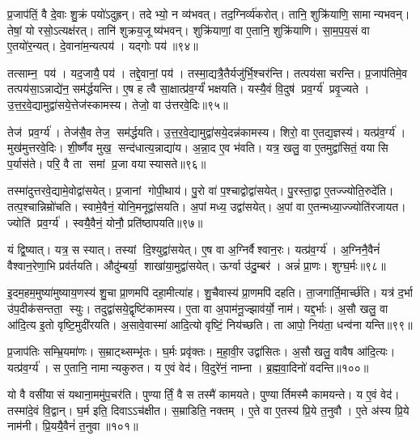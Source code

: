 प्र॒जाप॑तिं॒ वै दे॒वाः  शु॒क्रं पयो॑ऽदुह्रन्। 
तदेभ्यो॒ न व्य॑भवत्। 
तद॒ग्निर्व्य॑करोत्। 
तानि॒ शुक्रि॑याणि॒ सामान्यभवन्। 
तेषां॒ यो रसो॒ऽत्यक्ष॑रत्। 
तानि॑ शुक्रय॒जूष्य॑भवन्। 
शुक्रि॑याणां॒ वा ए॒तानि॒ शुक्रि॑याणि। 
सा॒म॒प॒य॒सं वा ए॒तयो॑र॒न्यत्। 
दे॒वाना॑म॒न्यत्पय॑। 
यद्गोः पय॑॥९४॥

तत्साम्न॒ पय॑। 
यद॒जायै॒ पय॑। 
तद्दे॒वानां॒ पय॑। 
तस्मा॒द्यत्रै॒तैर्यजु॑र्भि॒\-श्चर॑न्ति। 
तत्पय॑सा चरन्ति। 
प्र॒जाप॑तिमे॒व तत्पय॑सा॒ऽन्नाद्ये॑न॒ सम॑र्द्धयन्ति। 
ए॒ष ह त्वै सा॒क्षात्प्र॑व॒र्ग्यं॑ भक्षयति। 
यस्यै॒वं  वि॒दुष॑ प्रव॒र्ग्य॑ प्रवृ॒ज्यते। 
उ॒त्त॒र॒वे॒द्यामुद्वा॑स\-ये॒त्तेज॑स्कामस्य। 
तेजो॒ वा उ॑त्तरवे॒दिः॥९५॥

तेज॑ प्रव॒र्ग्य॑। 
तेज॑सै॒व तेज॒ सम॑र्द्धयति। 
उ॒त्त॒र॒वे॒द्यामुद्वा॑सये॒\-दन्न॑\-कामस्य। 
शिरो॒ वा ए॒तद्य॒ज्ञस्य॑। 
यत्प्र॑व॒र्ग्य॑। 
मुख॑मुत्तरवे॒दिः। 
शी॒र्ष्णैव मुख॒ सन्द॑धात्य॒न्नाद्या॑य। 
अ॒न्ना॒द ए॒व भ॑वति। 
यत्र॒ खलु॒ वा ए॒तमुद्वा॑सितं॒ वयासि प॒र्यास॑ते। 
परि॒ वै ता समां प्र॒जा वयास्यासते॥९६॥

तस्मा॑दुत्तरवे॒द्यामे॒वोद्वा॑सयेत्। 
प्र॒जानां गोपी॒थाय॑। 
पु॒रो वा॑ प॒श्चाद्वोद्वा॑सयेत्। 
पु॒रस्ता॒द्वा ए॒तज्ज्योति॒रुदे॑ति। 
तत्प॒श्चान्निम्रो॑चति। 
स्वामे॒वैनं॒ योनि॒मनूद्वा॑सयति। 
अ॒पां मध्य॒ उद्वा॑सयेत्। 
अ॒पां वा ए॒तन्मध्या॒ज्ज्योति॑रजायत। 
ज्योति॑ प्रव॒र्ग्य॑। 
स्वयै॒वैनं॒ योनौ॒ प्रति॑ष्ठापयति॥९७॥

यं द्वि॒ष्यात्। 
यत्र॒ स स्यात्। 
तस्यां दि॒श्युद्वा॑सयेत्। 
ए॒ष वा अ॒ग्निर्वैश्वान॒रः। 
यत्प्र॑व॒र्ग्य॑। 
अ॒ग्निनै॒वैनं॑ वैश्वान॒रेणा॒भि प्रव॑र्तयति। 
औदु॑म्बर्या॒ शाखा॑या॒मुद्वा॑सयेत्। 
ऊर्ग्वा उ॑दु॒म्बर॑। 
अन्नं॑ प्रा॒णः। 
शुग्घ॒र्मः॥९८॥

इ॒दम॒हम॒मुष्या॑मुष्याय॒णस्य॑ शु॒चा प्रा॒णमपि॑ दहा॒मीत्या॑ह। 
शु॒चैवास्य॑ प्रा॒णमपि॑ दहति। 
ता॒जगार्ति॒मार्च्छ॑ति। 
यत्र॑ द॒र्भा उ॑प॒दीक॑सन्तता॒ स्युः। 
तदुद्वा॑सये॒द्वृष्टि॑कामस्य। 
ए॒ता वा अ॒पाम॑नू॒ज्झाव॑र्यो॒ नाम॑। 
यद्द॒र्भाः। 
अ॒सौ खलु॒ वा आ॑दि॒त्य इ॒तो वृष्टि॒मुदी॑रयति। 
अ॒सावे॒वास्मा॑ आदि॒त्यो वृष्टिं॒ निय॑च्छति। 
ता आपो॒ निय॑ता॒ धन्व॑ना यन्ति॥९९॥

प्र॒जाप॑तिः सम्भ्रि॒यमा॑णः। 
स॒म्राट्थ्सम्भृ॑तः। 
घ॒र्मः प्रवृ॑क्तः। 
म॒हा॒वी॒र उद्वा॑सितः। 
अ॒सौ खलु॒ वावैष आ॑दि॒त्यः। 
यत्प्र॑व॒र्ग्य॑। 
स ए॒तानि॒ नामान्यकुरुत। 
य ए॒वं वेद॑। 
वि॒दुरे॑नं॒ नाम्ना। 
ब्र॒ह्म॒वा॒दिनो॑ वदन्ति॥१००॥

यो वै वसी॑यासं यथाना॒ममु॑प॒चर॑ति। 
पुण्यार्तिं॒ वै स तस्मै॑ कामयते। 
पुण्यार्तिमस्मै कामयन्ते। 
य ए॒वं वेद॑। 
तस्मा॑दे॒वं  वि॒द्वान्। 
घ॒र्म इति॒ दिवाऽऽच॑क्षीत। 
स॒म्राडिति॒ नक्तम्। 
ए॒ते वा ए॒तस्य॑ प्रि॒ये त॒नुवौ। 
ए॒ते अ॑स्य प्रि॒ये नाम॑नी। 
प्रि॒ययै॒वैनं॑ त॒नुवा॥१०१॥

